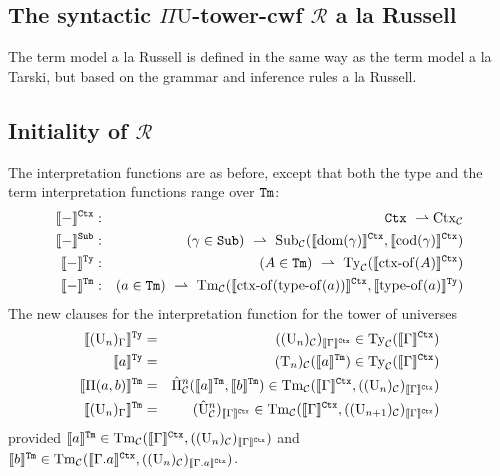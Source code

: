 \documentclass{lmcs}
\def\UU{\mathrm{U}}
\def\Ta{\mathrm{T}}
\def\Pihat{\hat{\Pi}}
\def\UUhat{\hat{\UU}}
\newcommand{\intCtxU}[1]{\llbracket #1 \rrbracket^\RawCtx}
\newcommand{\intSubU}[1]{\llbracket #1 \rrbracket^\RawSub}
\newcommand{\intTyU}[1]{\llbracket #1 \rrbracket^\RawTy}
\newcommand{\intTmU}[1]{\llbracket #1 \rrbracket^\RawTm}
\begin{document}
\begin{figure}
\boxit[Cumulativity:]{
\begin{mathpar}
\\
\infer{\Gamma \vdash a = a'  :  (\UU_{n+1})_\Gamma}
{\Gamma \vdash a = a' : (\UU_n)_\Gamma}
 \end{mathpar}
  }
  \label{fig:uu}
\end{figure}
\def\R{\mathcal{R}}
\subsection{The syntactic $\Pi\UU$-tower-cwf $\R$ a la Russell}
The term model a la Russell is defined in the same way as the term model a la Tarski, but based on the grammar and inference rules a la Russell.

\subsection{Initiality of $\R$}
The interpretation functions are as before, except that both the type and the term interpretation functions range over ${\tt Tm}$:
\begin{eqnarray*}
\intCtxU{-} &:& \RawCtx\ \rightharpoonup \Ctx_\C\\
\intSubU{-}&:& (\gamma \in \RawSub)\ \rightharpoonup \
\Sub_\C(\intCtxU{\domain(\gamma)}, \intCtxU{\codomain(\gamma)})\\
\intTyU{-}&:& (A \in \RawTm)\ \rightharpoonup\ \Ty_\C(\intCtxU{\ctxof(A)})\\
\intTmU{-}&:& (a \in\RawTm)\ \rightharpoonup\
\Tm_\C (\intCtxU{\ctxof(\typeof(a))}, \intTyU{\typeof(a)})
\end{eqnarray*}
The new clauses for the interpretation function for the tower of universes
\begin{eqnarray*}
\intTyU{(\UU_n)_\Gamma} &=& ((\UU_n)_\C)_{\intCtxU{\Gamma}} \in \Ty_\C(\intCtxU{\Gamma})\\
\intTyU{a} &=& (\Ta_n)_\C(\intTmU{a}) \in \Ty_\C(\intCtxU{\Gamma})\\
\intTmU{\Pi(a,b)}&=& \Pihat^n_\C(\intTmU{a},\intTmU{b}) \in \Tm_\C(\intCtxU{\Gamma},((\UU_n)_\C)_{\intCtxU{\Gamma}})\\
\intTmU{(\UU_n)_\Gamma} &=& (\UUhat^n_\C)_{\intCtxU{\Gamma}} \in \Tm_\C(\intCtxU{\Gamma},((\UU_{n+1})_\C)_{\intCtxU{\Gamma}})
\end{eqnarray*}
provided
$\intTmU{a} \in \Tm_\C(\intCtxU{\Gamma},((\UU_n)_\C)_{\intCtxU{\Gamma}})$ and 
$\intTmU{b} \in \Tm_\C(\intCtxU{\Gamma.a},((\UU_n)_\C)_{\intCtxU{\Gamma.a}})$.
\end{document}
